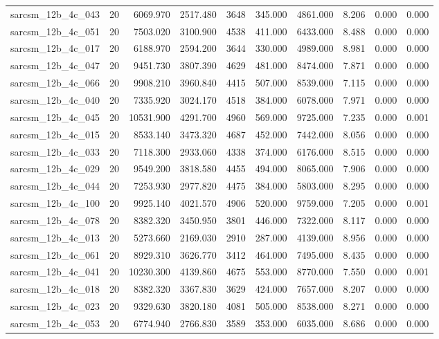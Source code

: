 \begin{tabular}{lrrrrrrrrr}
sarcsm\_12b\_4c\_043 & 20 & 6069.970 & 2517.480 & 3648 & 345.000 & 4861.000 & 8.206 & 0.000 & 0.000 \\
sarcsm\_12b\_4c\_051 & 20 & 7503.020 & 3100.900 & 4538 & 411.000 & 6433.000 & 8.488 & 0.000 & 0.000 \\
sarcsm\_12b\_4c\_017 & 20 & 6188.970 & 2594.200 & 3644 & 330.000 & 4989.000 & 8.981 & 0.000 & 0.000 \\
sarcsm\_12b\_4c\_047 & 20 & 9451.730 & 3807.390 & 4629 & 481.000 & 8474.000 & 7.871 & 0.000 & 0.000 \\
sarcsm\_12b\_4c\_066 & 20 & 9908.210 & 3960.840 & 4415 & 507.000 & 8539.000 & 7.115 & 0.000 & 0.000 \\
sarcsm\_12b\_4c\_040 & 20 & 7335.920 & 3024.170 & 4518 & 384.000 & 6078.000 & 7.971 & 0.000 & 0.000 \\
sarcsm\_12b\_4c\_045 & 20 & 10531.900 & 4291.700 & 4960 & 569.000 & 9725.000 & 7.235 & 0.000 & 0.001 \\
sarcsm\_12b\_4c\_015 & 20 & 8533.140 & 3473.320 & 4687 & 452.000 & 7442.000 & 8.056 & 0.000 & 0.000 \\
sarcsm\_12b\_4c\_033 & 20 & 7118.300 & 2933.060 & 4338 & 374.000 & 6176.000 & 8.515 & 0.000 & 0.000 \\
sarcsm\_12b\_4c\_029 & 20 & 9549.200 & 3818.580 & 4455 & 494.000 & 8065.000 & 7.906 & 0.000 & 0.000 \\
sarcsm\_12b\_4c\_044 & 20 & 7253.930 & 2977.820 & 4475 & 384.000 & 5803.000 & 8.295 & 0.000 & 0.000 \\
sarcsm\_12b\_4c\_100 & 20 & 9925.140 & 4021.570 & 4906 & 520.000 & 9759.000 & 7.205 & 0.000 & 0.001 \\
sarcsm\_12b\_4c\_078 & 20 & 8382.320 & 3450.950 & 3801 & 446.000 & 7322.000 & 8.117 & 0.000 & 0.000 \\
sarcsm\_12b\_4c\_013 & 20 & 5273.660 & 2169.030 & 2910 & 287.000 & 4139.000 & 8.956 & 0.000 & 0.000 \\
sarcsm\_12b\_4c\_061 & 20 & 8929.310 & 3626.770 & 3412 & 464.000 & 7495.000 & 8.435 & 0.000 & 0.000 \\
sarcsm\_12b\_4c\_041 & 20 & 10230.300 & 4139.860 & 4675 & 553.000 & 8770.000 & 7.550 & 0.000 & 0.001 \\
sarcsm\_12b\_4c\_018 & 20 & 8382.320 & 3367.830 & 3629 & 424.000 & 7657.000 & 8.207 & 0.000 & 0.000 \\
sarcsm\_12b\_4c\_023 & 20 & 9329.630 & 3820.180 & 4081 & 505.000 & 8538.000 & 8.271 & 0.000 & 0.000 \\
sarcsm\_12b\_4c\_053 & 20 & 6774.940 & 2766.830 & 3589 & 353.000 & 6035.000 & 8.686 & 0.000 & 0.000 \\

\end{tabular}
